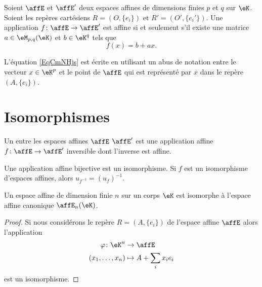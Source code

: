 \begin{theorem}
    Soient \( \affE\) et \( \affE'\) deux espaces affines de dimensions finies \( p\) et \( q\) sur \( \eK\). Soient les repères cartésiens \( R=(O,\{ e_i \})\) et \( R'=(O',\{ e_i' \})\). Une application \( f\colon \affE\to \affE'\) est affine si et seulement s'il existe une matrice \( a\in\eM_{p,q}(\eK)\) et \( b\in \eK^q\) tels que
    \begin{equation}    \label{EqCmNHjs}
        f(x)=b+ax.
    \end{equation}
\end{theorem}

\begin{remark}
    L'équation \eqref{EqCmNHjs} est écrite en utilisant un abus de notation entre le vecteur \( x\in \eK^p\) et le point de \( \affE\) qui est représenté par \( x\) dans le repère \( (A,\{ e_i \})\).
\end{remark}

\section{Isomorphismes}

\begin{definition}
    Un  entre les espaces affines \( \affE\) \( \affE'\) est une application affine \( f\colon \affE\to \affE'\) inversible dont l'inverse est affine.
\end{definition}

\begin{proposition} \label{PropxtFeDE}
    Une application affine bijective est un isomorphisme. Si \( f\) est un isomorphisme d'espaces affines, alors \( u_{f^{-1}}=(u_f)^{-1}\).
\end{proposition}

\begin{proposition}
    Un espace affine de dimension finie \( n\) sur un corps \( \eK\) est isomorphe à l'espace affine canonique \( \affE_n(\eK)\).
\end{proposition}

\begin{proof}
    Si nous considérons le repère \( R=(A,\{ e_i \})\) de l'espace affine \( \affE\) alors l'application
    \begin{equation}
        \begin{aligned}
            \varphi\colon \eK^n&\to \affE \\
            (x_1,\ldots,x_n)&\mapsto A+\sum_ix_ie_i
        \end{aligned}
    \end{equation}
    est un isomorphisme.
\end{proof}

